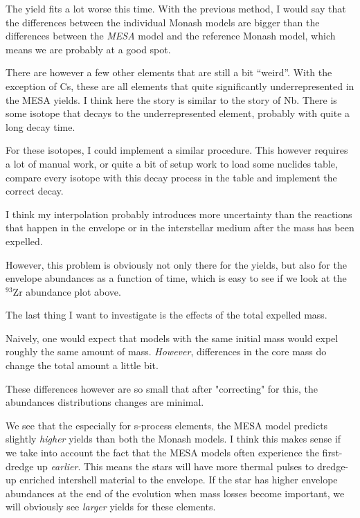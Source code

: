 \documentclass[a4paper,10pt]{article}
\begin{document}
\begin{figure}[ht]
    \centering
\end{figure}
\begin{figure}[ht]
    \centering
\end{figure}

The yield fits a lot worse this time. With the previous method, I would say that the differences
between the individual Monash models are bigger than the differences between the \emph{MESA} model and the
reference Monash model, which means we are probably at a good spot.

There are however a few other elements that are
still a bit ``weird''. With the exception of Cs, these are all elements that quite significantly
underrepresented in the MESA yields. I think here the story is similar to the story of Nb.
There is some isotope that decays to the underrepresented element, probably with quite a long decay time.

For these isotopes, I could implement a similar procedure. This however requires a lot of manual work, or
quite a bit of setup work to load some nuclides table, compare every isotope with this decay process
in the table and implement the correct decay.

I think my interpolation probably introduces more uncertainty than the reactions that happen in the envelope
or in the interstellar medium after the mass has been expelled.

However, this problem is obviously not only there for the yields, but also for the envelope abundances as a
function of time, which is easy to see if we look at the \(^{93}\text{Zr}\) abundance plot above.

The last thing I want to investigate is the effects of the total expelled mass.

Naively, one would expect that models with the same initial mass would expel roughly
the same amount of mass.
\emph{However}, differences in the core mass do change the total amount a little bit.
\begin{figure}[ht]
    \centering
\end{figure}

These differences however are so small that after "correcting" for this, the abundances
distributions changes are minimal.

We see that the especially for s-process elements, the MESA model predicts slightly
\emph{higher} yields than both the Monash models. I think this makes sense if we take into
account the fact that the MESA models often experience the first-dredge up \emph{earlier}.
This means the stars will have more thermal pulses to dredge-up enriched intershell material
to the envelope. If the star has higher envelope abundances at the end of the evolution when
mass losses become important, we will obviously see \emph{larger} yields for these elements.
\end{document}
